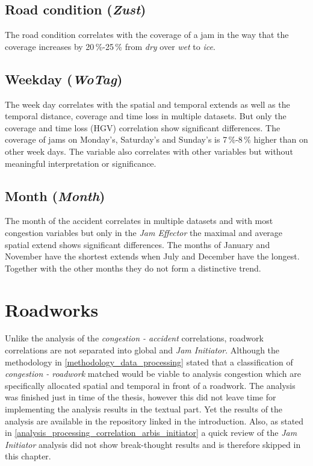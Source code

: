 \subsection{Road condition (\textit{Zust})}
\label{analysis_sum_Zust}
The road condition correlates with the coverage of a jam in the way that the coverage increases by 20\,\%-25\,\% from \textit{dry} over \textit{wet} to \textit{ice}.

\subsection{Weekday (\textit{WoTag})}
\label{analysis_sum_WoTag}
The week day correlates with the spatial and temporal extends as well as the temporal distance, coverage and time loss in multiple datasets. But only the coverage and time loss (HGV) correlation show significant differences. The coverage of jams on Monday's, Saturday's and Sunday's is 7\,\%-8\,\% higher than on other week days. The variable also correlates with other variables but without meaningful interpretation or significance.

\subsection{Month (\textit{Month})}
\label{analysis_sum_Month}
The month of the accident correlates in multiple datasets and with most congestion variables but only in the \textit{Jam Effector} the maximal and average spatial extend shows significant differences. The months of January and November have the shortest extends when July and December have the longest. Together with the other months they do not form a distinctive trend. 

\section{Roadworks}
\label{analysis_summary_roadwork}
Unlike the analysis of the \textit{congestion - accident} correlations, roadwork correlations are not separated into global and \textit{Jam Initiator}. Although the methodology in \cref{methodology_data_processing} stated that a classification of \textit{congestion - roadwork} matched would be viable to analysis congestion which are specifically allocated spatial and temporal in front of a roadwork. The analysis was finished just in time of the thesis, however this did not leave time for implementing the analysis results in the textual part. Yet the results of the analysis are available in the repository linked in the introduction. Also, as stated in \cref{analysis_processing_correlation_arbis_initiator} a quick review of the \textit{Jam Initiator} analysis did not show break-thought results and is therefore skipped in this chapter.

